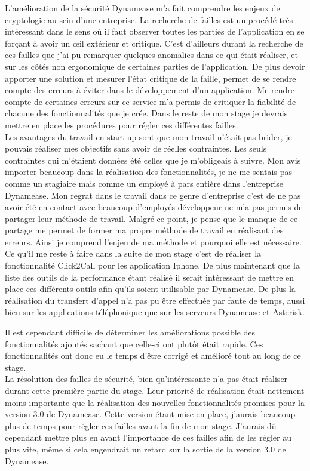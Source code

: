 L'amélioration de la sécurité Dynamease m'a fait comprendre les enjeux de cryptologie au sein d'une entreprise. La recherche de failles est un procédé très intéressant dans le sens où il faut observer toutes les parties de l'application en se forçant à avoir un œil extérieur et critique. C'est d’ailleurs durant la recherche de ces failles que j'ai pu remarquer quelques anomalies dans ce qui était réaliser, et sur les côtés non ergonomique de certaines parties de l'application. De plus devoir apporter une solution et mesurer l'état critique de la faille, permet de se rendre compte des erreurs à éviter dans le développement d'un application. Me rendre compte de certaines erreurs sur ce service m'a permis de critiquer la fiabilité de chacune des fonctionnalités que je crée. Dans le reste de mon stage je devrais mettre en place les procédures pour régler ces différentes failles.\\

Les avantages du travail en start up sont que mon travail n'était pas brider, je pouvais réaliser mes objectifs sans avoir de réelles contraintes. Les seuls contraintes qui m'étaient données été celles que je m'obligeais à suivre. Mon avis importer beaucoup dans la réalisation des fonctionnalités, je ne me sentais pas comme un stagiaire mais comme un employé à pars entière dans l'entreprise Dynamease. Mon regrat dans le travail dans ce genre d'entreprise c'est de ne  pas avoir été en contact avec beaucoup d'employés développeur ne m'a pas permis de partager leur méthode de travail. Malgré ce point, je pense que le manque de ce partage me permet de former ma propre méthode de travail en réalisant des erreurs. Ainsi je comprend l'enjeu de ma méthode et pourquoi elle est nécessaire.\\

Ce qu'il me reste à faire dans la suite de mon stage c'est de réaliser la fonctionnalité Click2Call pour les application Iphone. De plus maintenant que la liste des outils de la performance étant réalisé il serait intéressant de mettre en place ces différents outils afin qu'ils soient utilisable par Dynamease. De plus la réalisation du transfert d'appel n'a pas pu être effectuée par faute de temps, aussi bien sur les applications téléphonique que sur les serveurs Dynamease et Asterisk.

Il est cependant difficile de déterminer les améliorations possible des fonctionnalités ajoutés sachant que celle-ci ont plutôt était rapide. Ces fonctionnalités ont donc eu le temps d'être corrigé et amélioré tout au long de ce stage.\\

La résolution des failles de sécurité, bien qu’intéressante n'a pas était réaliser durant cette première partie du stage. Leur priorité de réalisation était nettement moins importante que la réalisation des nouvelles fonctionnalités promises pour la version 3.0 de Dynamease. Cette version étant mise en place, j'aurais beaucoup plus de temps pour régler ces failles avant la fin de mon stage. J'aurais dû cependant mettre plus en avant l'importance de ces failles afin de les régler au plus vite, même si cela engendrait un retard sur la sortie de la version 3.0 de Dynamease. 